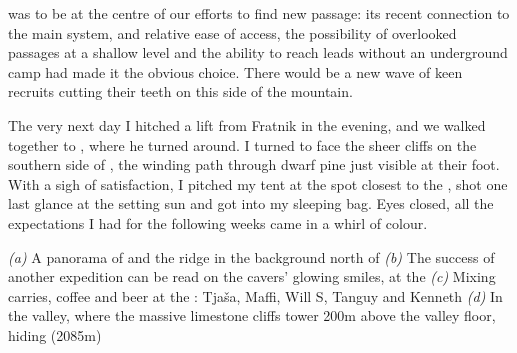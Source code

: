  was to be at the centre of our efforts to find new passage: its recent connection to the main system, and relative ease of access, the possibility of overlooked passages at a shallow level and the ability to reach leads without an underground camp had made it the obvious choice. There would be a new wave of keen recruits cutting their teeth on this side of the mountain. 

The very next day I hitched a lift from Fratnik in the evening, and we walked together to , where he turned around. I turned to face the sheer cliffs on the southern side of , the winding path through dwarf pine just visible at their foot. With a sigh of satisfaction, I pitched my tent at the spot closest to the , shot one last glance at the setting sun and got into my sleeping bag. Eyes closed, all the expectations I had for the following weeks came in a whirl of colour.


\begin{pagefigure}
\checkoddpage \ifoddpage \forcerectofloat \else \forceversofloat \fi
   \centering
    \begin{subfigure}[t]{\textwidth}
    \centering
        \caption{} \label{Panoramafrom tolmin}
    \end{subfigure}
    \begin{subfigure}[t]{0.45\textwidth}
        \centering
        \caption{} \label{selfie}
    \end{subfigure}
    \begin{subfigure}[t]{0.53\textwidth}
        \centering
        \caption{} \label{Kal}
    \end{subfigure}
  \hfill
    \centering
    \begin{subfigure}[t]{\textwidth}
        \centering
        \caption{} \label{limestone cliffs}
    \end{subfigure}
  

    \caption{
    \emph{(a)} A panorama of \protect{} and the \protect{} ridge in the background
north of \protect{} 
\emph{(b)} The success of another expedition can be read on the cavers' glowing smiles, at the \protect{} 
    \emph{(c)} Mixing carries, coffee and beer at the \protect{}: Tja\v{s}a, Maffi, Will S, Tanguy and Kenneth 
    \emph{(d)} In the \protect{} valley, where the massive limestone cliffs tower 200m above the valley floor, hiding \protect{} (2085m) 
    }
\end{pagefigure}